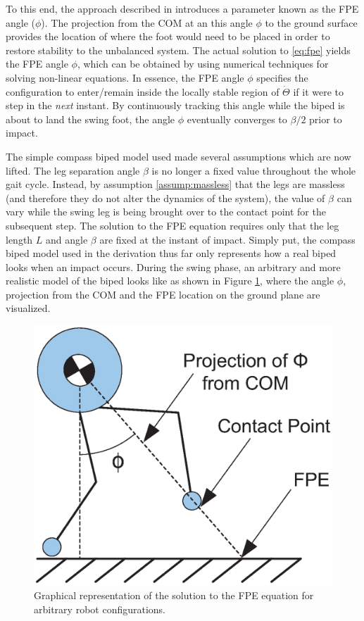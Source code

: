 To this end, the approach described in \cite{Wight:2008vt} introduces a parameter known as the FPE angle ($\phi$). The projection from the COM at an this angle $\phi$ to the ground surface provides the location of where the foot would need to be placed in order to restore stability to the unbalanced system. The actual solution to \eqref{eq:fpe} yields the FPE angle $\phi$, which can be obtained by using numerical techniques for solving non-linear equations. In essence, the FPE angle $\phi$ specifies the configuration to enter/remain inside the locally stable region of $\dot{\Theta}$ if it were to step in the \textit{next} instant. By continuously tracking this angle while the biped is about to land the swing foot, the angle $\phi$ eventually converges to $\beta/2$ prior to impact.

The simple compass biped model used made several assumptions which are now lifted. The leg separation angle $\beta$ is no longer a fixed value throughout the whole gait cycle. Instead, by assumption \ref{assump:massless} that the legs are massless (and therefore they do not alter the dynamics of the system), the value of $\beta$ can vary while the swing leg is being brought over to the contact point for the subsequent step. The solution to the FPE equation requires only that the leg length $L$ and angle $\beta$ are fixed at the instant of impact. Simply put, the compass biped model used in the derivation thus far only represents how a real biped looks when an impact occurs. During the swing phase, an arbitrary and more realistic model of the biped looks like as shown in Figure \ref{fig:phi}, where the angle $\phi$, projection from the COM and the FPE location on the ground plane are visualized. 

\begin{figure}[h]
	\centering
    \includegraphics[scale=0.6]{fig/fpe/fig5.eps}
  	\caption{Graphical representation of the solution to the FPE equation for arbitrary robot configurations.}
	\label{fig:phi}
\end{figure}

